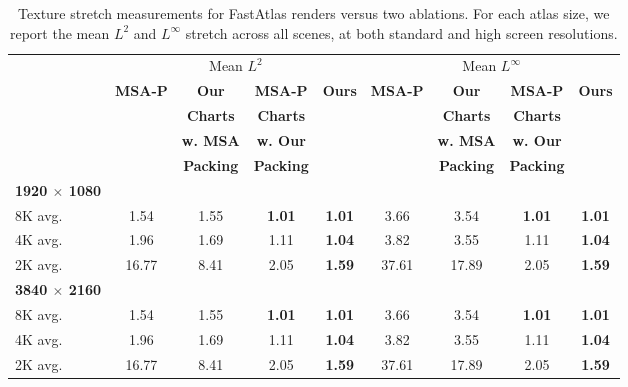 \begin{table}
\scriptsize
\setlength{\tabcolsep}{2pt}
\centering
\begin{tabular}{l|ccc|c|ccc|c}
  & \multicolumn{4}{c|}{Mean $L^2$} & \multicolumn{4}{c}{Mean $L^\infty$} \\
  & \textbf{MSA-P} & \textbf{Our} & \textbf{MSA-P} & \textbf{Ours} & \textbf{MSA-P} & \textbf{Our} & \textbf{MSA-P} & \textbf{Ours} \\
  &  & \textbf{Charts} & \textbf{Charts} & & & \textbf{Charts} & \textbf{Charts} & \\
  &  & \textbf{w. MSA} & \textbf{w. Our} & & & \textbf{w. MSA} & \textbf{w. Our} & \\
  &  & \textbf{Packing} & \textbf{Packing} & & & \textbf{Packing} & \textbf{Packing} & \\
\hline
\textbf{1920 $\times$ 1080} & & & & & & & & \\
8K avg. & 1.54  & 1.55  & \textbf{1.01} & \textbf{1.01} & 3.66   & 3.54  & \textbf{1.01} & \textbf{1.01} \\
4K avg. & 1.96  & 1.69  & 1.11          & \textbf{1.04} & 3.82   & 3.55  & 1.11          & \textbf{1.04} \\
2K avg. & 16.77 & 8.41  & 2.05          & \textbf{1.59} & 37.61  & 17.89 & 2.05          & \textbf{1.59} \\
\hline
\textbf{3840 $\times$ 2160} & & & & & & & & \\
8K avg. & 1.54  & 1.55  & \textbf{1.01} & \textbf{1.01} & 3.66   & 3.54  & \textbf{1.01} & \textbf{1.01} \\
4K avg. & 1.96  & 1.69  & 1.11          & \textbf{1.04} & 3.82   & 3.55  & 1.11          & \textbf{1.04} \\
2K avg. & 16.77 & 8.41  & 2.05          & \textbf{1.59} & 37.61  & 17.89 & 2.05          & \textbf{1.59} \\
\end{tabular}

\vspace{1mm}
\caption{Texture stretch measurements \cite{sander2001texture} for FastAtlas renders versus two ablations. For each atlas size, we report the mean $L^2$ and $L^\infty$ stretch across all scenes, at both standard and high screen resolutions.}
\label{tab:ablation_stretch}
\vspace{-5mm}
\end{table}
